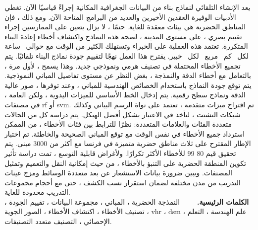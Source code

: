 يعد الإنشاء التلقائي لنماذج بناء  من البيانات الجغرافية المكانية إجراءً قياسيًا الآن.
تغطي الأدبيات الوفيرة العقدين الأخيرين والعديد من البرامج المتاحة الآن.
ومع ذلك ، فإن المناطق الحضرية هي بيئات معقدة للغاية.
حتمًا ، لا يزال يتعين على الممارسين إجراء تقييم بصري ، على مستوى المدينة ، لصحة هذه النماذج واكتشاف أخطاء إعادة البناء المتكررة.
تعتمد هذه العملية على الخبراء وتستهلك الكثير من الوقت مع حوالي  {\ ساعة \ لكل \ كم \ مربع \ لكل \ خبير}.
يقترح هذا العمل نهجًا لتقييم جودة نماذج البناء  تلقائيًا.
يتم تجميع الأخطاء المحتملة في تصنيف هرمي ونموذجي جديد.
وهذا يسمح ، لأول مرة ، بالتعامل مع أخطاء الدقة والنمذجة ، بغض النظر عن مستوى تفاصيل المباني النموذجية.
يتم توقع جودة النماذج باستخدام الخصائص الهندسية للمباني ، وعند توفرها ، صور عالية الدقة ونماذج سطح رقمية.
يتم إدخال الخط الأساسي للميزات اليدوية ، ولكن العامة ، في مصنفات rf أو svm.
تم اقتراح ميزات متقدمة ، تعتمد على نواة الرسم البياني وكذلك شبكات التشتت ، لتأخذ في الاعتبار بشكل أفضل الهيكل.
يتم دراسة كل من الحالات متعددة الفئات والعلامات المتعددة: نظرًا للترابط بين فئات الأخطاء ، من الممكن استرداد جميع الأخطاء في نفس الوقت مع توقع المباني الصحيحة والخاطئة.
تم اختبار الإطار المقترح على ثلاث مناطق حضرية متميزة في فرنسا مع أكثر من 3000 مبنى.
يتم تحقيق قيم 80 99 للأخطاء الأكثر تكرارًا.
ولأغراض قابلية التوسع ، تمت دراسة تأثير تكوين المنطقة الحضرية على التنبؤ بالأخطاء ، من حيث إمكانية النقل والتعميم وتمثيل المصنفات.
ويبين ضرورة بيانات الاستشعار عن بعد متعددة الوسائط ومزج عينات التدريب من مدن مختلفة لضمان استقرار نسب الكشف ، حتى مع أحجام مجموعات التدريب محدودة للغاية. \\

\textbf{الكلمات الرئيسية.} ~ \ ~  النمذجة الحضرية ، المباني ، مجموعة البيانات ، تقييم الجودة ، تصنيف الأخطاء ، اكتشاف الأخطاء ، الصور الجوية ، vhr ، dsm ، علم الهندسة ، التعلم الإحصائي ، التصنيف متعدد التصنيفات. \\
